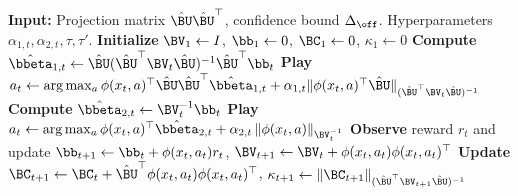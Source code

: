 \begin{algorithm}[htbp!]
\centering
	\caption{}
    \label{alg:proball-ucb}
	\begin{algorithmic}[1]
	    \STATE \textbf{Input:} Projection matrix $\hat \BU \hat \BU^\top$, confidence bound $\Delta_{\off}$. Hyperparameters $\alpha_{1,t}, \alpha_{2,t}, \tau, \tau'$.
        \STATE \textbf{Initialize} $\BV_1 \gets I$, $\bb_{1} \gets 0$, $\BC_1 \gets 0$, $\kappa_1 \gets 0$
            \STATE \textbf{Compute} $\hat \bbeta_{1,t} \gets \hat \BU (\hat \BU^\top \BV_{t} \hat \BU)^{-1} \hat \BU^\top \bb_t$
            \STATE \textbf{Play} $a_t \gets \arg\max_{a} \phi(x_t, a)^\top \hat \BU \hat \BU^\top \hat \bbeta_{1,t} 
            + \alpha_{1,t}\Vert\phi(x_t, a)^\top \hat \BU\Vert_{(\hat \BU^\top \BV_t \hat \BU)^{-1}}$
            \ELSE 
            \STATE \textbf{Compute} $\hat \bbeta_{2,t} \gets \BV_{t}^{-1} \bb_t$
            \STATE \textbf{Play} $a_t \gets \arg\max_{a} \phi(x_t, a)^\top \hat \bbeta_{2,t} + \alpha_{2,t}\left\Vert\phi(x_t, a)\right\Vert_{\BV_t^{-1}}$
            \ENDIF
            \STATE \textbf{Observe} reward $r_t$ and update $\bb_{t+1} \gets \bb_t + \phi(x_t, a_t)r_t$, $\BV_{t+1} \gets \BV_t + \phi(x_t, a_t)\phi(x_t, a_t)^\top$
            \STATE \textbf{Update} $\BC_{t+1} \gets \BC_t + \hat \BU^\top \phi(x_t, a_t)\phi(x_t, a_t)^\top $, $\kappa_{t+1} \gets \|\BC_{t+1}\|_{(\hat \BU^\top \BV_{t+1} \hat \BU)^{-1}}$
        \ENDFOR
	\end{algorithmic}
\end{algorithm}

